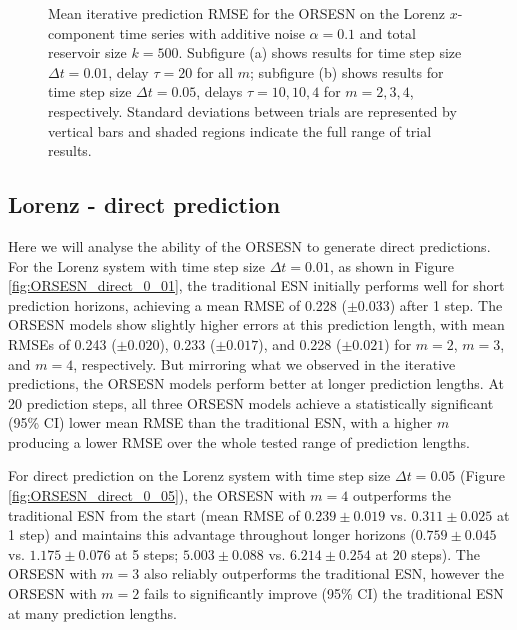 \begin{figure}
    \caption{Mean iterative prediction RMSE for the ORSESN on the Lorenz $x$-component time series with additive noise $\alpha=0.1$ and total reservoir size $k=500$. Subfigure (a) shows results for time step size $\Delta t=0.01$, delay $\tau=20$ for all $m$; subfigure (b) shows results for time step size $\Delta t=0.05$, delays $\tau=10,10,4$ for $m=2,3,4$, respectively. Standard deviations between trials are represented by vertical bars and shaded regions indicate the full range of trial results.}
\end{figure}



\subsection{Lorenz - direct prediction}


Here we will analyse the ability of the ORSESN to generate direct predictions. For the Lorenz system with time step size $\Delta t=0.01$, as shown in Figure \ref{fig:ORSESN_direct_0_01}, the traditional ESN initially performs well for short prediction horizons, achieving a mean RMSE of 0.228 ($\pm 0.033$) after 1 step. The ORSESN models show slightly higher errors at this prediction length, with mean RMSEs of 0.243 ($\pm 0.020$), 0.233 ($\pm 0.017$), and 0.228 ($\pm 0.021$) for $m=2$, $m=3$, and $m=4$, respectively. But mirroring what we observed in the iterative predictions, the ORSESN models perform better at longer prediction lengths. At 20 prediction steps, all three ORSESN models achieve a statistically significant (95\% CI) lower mean RMSE than the traditional ESN, with a higher $m$ producing a lower RMSE over the whole tested range of prediction lengths.

For direct prediction on the Lorenz system with time step size $\Delta t=0.05$ (Figure \ref{fig:ORSESN_direct_0_05}), the ORSESN with $m=4$ outperforms the traditional ESN from the start (mean RMSE of $0.239\pm 0.019$ vs. $0.311\pm 0.025$ at 1 step) and maintains this advantage throughout longer horizons ($0.759\pm 0.045$ vs. $1.175\pm 0.076$ at 5 steps; $5.003\pm 0.088$ vs. $6.214\pm 0.254$ at 20 steps). The ORSESN with $m=3$ also reliably outperforms the traditional ESN, however the ORSESN with $m=2$ fails to significantly improve (95\% CI) the traditional ESN at many prediction lengths.

